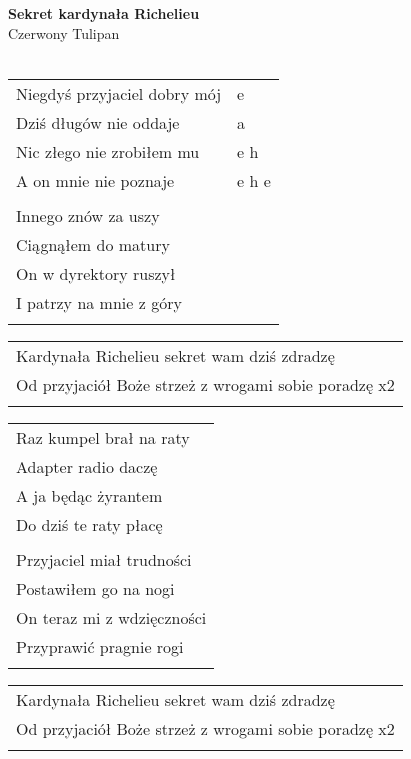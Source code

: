 \documentclass[a5paper]{article}
\begin{document}


\noindent
\fontsize{12pt}{15pt}\selectfont
\textbf{Sekret kardynała Richelieu} \\
\fontsize{8pt}{10pt}\selectfont
Czerwony Tulipan \\ \\
\fontsize{10pt}{12pt}\selectfont
{}
\begin{tabular}{@{}p{6.50cm}p{3cm}@{}}
\noindent
Niegdyś przyjaciel dobry mój & e \\
Dziś długów nie oddaje & a \\
Nic złego nie zrobiłem mu & e h \\
A on mnie nie poznaje & e h e \\ \\

Innego znów za uszy & \\
Ciągnąłem do matury & \\
On w dyrektory ruszył & \\
I patrzy na mnie z góry & \\ \\
\end{tabular}

\noindent
\begin{tabular}{@{}p{8.50cm}@{}}
Kardynała Richelieu sekret wam dziś zdradzę \\
Od przyjaciół Boże strzeż z wrogami sobie poradzę x2 \\ \\
\end{tabular}

\noindent
\begin{tabular}{@{}p{9.50cm}@{}}
Raz kumpel brał na raty \\
Adapter radio daczę \\
A ja będąc żyrantem \\
Do dziś te raty płacę \\ \\

Przyjaciel miał trudności \\
Postawiłem go na nogi \\
On teraz mi z wdzięczności \\
Przyprawić pragnie rogi \\ \\
\end{tabular}

\noindent
\begin{tabular}{@{}p{8.50cm}@{}}
Kardynała Richelieu sekret wam dziś zdradzę \\
Od przyjaciół Boże strzeż z wrogami sobie poradzę x2 \\ \\
\end{tabular}
\end{document}
